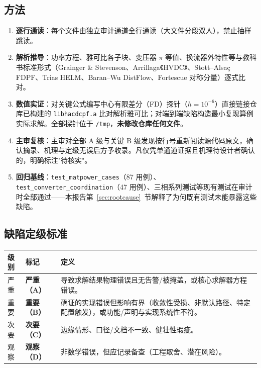 \documentclass[11pt,a4paper,fontset=fandol]{ctexart}
\newcommand{\file}[1]{\texttt{#1}}
\newcommand{\sevA}{\textcolor{hyred}{\textbf{严重（A）}}}
\newcommand{\sevB}{\textcolor{hyorange}{\textbf{重要（B）}}}
\newcommand{\sevC}{\textcolor{hyblue}{\textbf{次要（C）}}}
\newcommand{\sevD}{\textcolor{hygray}{\textbf{观察（D）}}}
\begin{document}
\subsection{方法}

\begin{enumerate}
  \item \textbf{逐行通读}：每个文件由独立审计通道全行通读（大文件分段双人），禁止抽样跳读。
  \item \textbf{解析推导}：功率方程、雅可比各子块、变压器 $\pi$ 等值、换流器外特性等与教科书标准形式（Grainger \& Stevenson、Arrillaga《HVDC》、Stott--Alsa\c{c} FDPF、Trias HELM、Baran--Wu DistFlow、Fortescue 对称分量）逐式比对。
  \item \textbf{数值实证}：对关键公式编写中心有限差分（FD）探针（$h=10^{-6}$）直接链接仓库已构建的 \file{libhacdcpf.a} 比对解析雅可比；对端到端缺陷构造最小复现算例实际求解。全部探针位于 \file{/tmp}，\textbf{未修改仓库任何文件}。
  \item \textbf{主审复核}：主审对全部 A 级与关键 B 级发现按行号重新阅读源代码原文，确认摘录、机理与定级无误后方予收录。凡仅凭单通道证据且机理待设计者确认的，明确标注"待核实"。
  \item \textbf{回归基线}：\file{test\_matpower\_cases}（87 用例）、\file{test\_converter\_coordination}（47 用例）、三相系列测试等现有测试在审计时全部通过——本报告第~\ref{sec:rootcause}~节解释了为何既有测试未能暴露这些缺陷。
\end{enumerate}

\subsection{缺陷定级标准}

\begin{center}
\begin{tabular}{@{}llp{9.5cm}@{}}
\toprule
\textbf{级别} & \textbf{标记} & \textbf{定义}\\
\midrule
严重 & \sevA{} & 导致求解结果物理错误且无告警/被掩盖，或核心求解器方程错误。\\
重要 & \sevB{} & 确证的实现错误但影响有界（收敛性受损、非默认路径、特定配置触发），或功能/声明与实现系统性不符。\\
次要 & \sevC{} & 边缘情形、口径/文档不一致、健壮性瑕疵。\\
观察 & \sevD{} & 非数学错误，但应记录备查（工程取舍、潜在风险）。\\
\bottomrule
\end{tabular}
\end{center}
\end{document}
